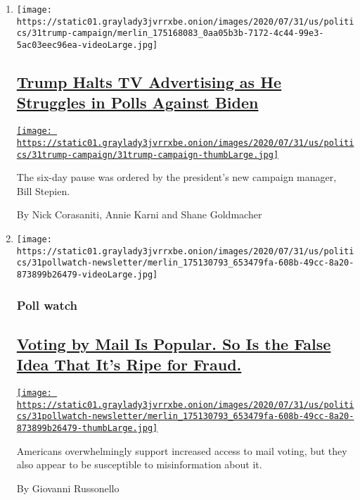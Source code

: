 \begin{enumerate}
\def\labelenumi{\arabic{enumi}.}
\item
  \texttt{[image: https://static01.graylady3jvrrxbe.onion/images/2020/07/31/us/politics/31trump-campaign/merlin\_175168083\_0aa05b3b-7172-4c44-99e3-5ac03eec96ea-videoLarge.jpg]}

  \hypertarget{trump-halts-tv-advertising-as-he-struggles-in-polls-against-biden}{%
  \subsection{\texorpdfstring{\href{/2020/07/31/us/politics/trump-campaign-tv-advertising.html}{Trump
  Halts TV Advertising as He Struggles in Polls Against
  Biden}}{Trump Halts TV Advertising as He Struggles in Polls Against Biden}}\label{trump-halts-tv-advertising-as-he-struggles-in-polls-against-biden}}

  \href{/2020/07/31/us/politics/trump-campaign-tv-advertising.html}{\texttt{[image: https://static01.graylady3jvrrxbe.onion/images/2020/07/31/us/politics/31trump-campaign/31trump-campaign-thumbLarge.jpg]}}

  The six-day pause was ordered by the president's new campaign manager,
  Bill Stepien.

  By Nick Corasaniti, Annie Karni and Shane Goldmacher
\item
  \texttt{[image: https://static01.graylady3jvrrxbe.onion/images/2020/07/31/us/politics/31pollwatch-newsletter/merlin\_175130793\_653479fa-608b-49cc-8a20-873899b26479-videoLarge.jpg]}

  \hypertarget{poll-watch}{%
  \subsubsection{Poll watch}\label{poll-watch}}

  \hypertarget{voting-by-mail-is-popular-so-is-the-false-idea-that-its-ripe-for-fraud}{%
  \subsection{\texorpdfstring{\href{/2020/07/31/us/politics/trump-mail-voting-fraud.html}{Voting
  by Mail Is Popular. So Is the False Idea That It's Ripe for
  Fraud.}}{Voting by Mail Is Popular. So Is the False Idea That It's Ripe for Fraud.}}\label{voting-by-mail-is-popular-so-is-the-false-idea-that-its-ripe-for-fraud}}

  \href{/2020/07/31/us/politics/trump-mail-voting-fraud.html}{\texttt{[image: https://static01.graylady3jvrrxbe.onion/images/2020/07/31/us/politics/31pollwatch-newsletter/merlin\_175130793\_653479fa-608b-49cc-8a20-873899b26479-thumbLarge.jpg]}}

  Americans overwhelmingly support increased access to mail voting, but
  they also appear to be susceptible to misinformation about it.

  By Giovanni Russonello
\end{enumerate}

